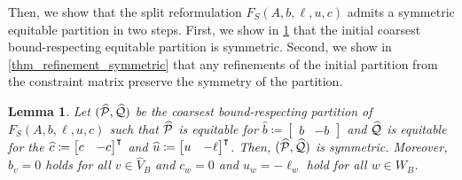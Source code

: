 \documentclass[pdflatex,sn-mathphys-num]{sn-jnl}%
\theoremstyle{thmstyleone}%
\newtheorem{lemma}[lemma]{Lemma}
\theoremstyle{thmstylethree}%
\theoremstyle{thmstyletwo}%
\begin{document}
Then, we show that the split reformulation $F_S(A,b,\ell,u,c)$ admits a symmetric equitable partition in two steps. First, we show in \cref{thm_initial_partition_symmetric} that the initial coarsest bound-respecting equitable partition is symmetric. Second, we show in \cref{thm_refinement_symmetric} that any refinements of the initial partition from the constraint matrix preserve the symmetry of the partition. 

\begin{lemma}
\label{thm_initial_partition_symmetric}
Let $(\widehat{\mathcal{P}},\widehat{\mathcal{Q}})$ be the coarsest bound-respecting partition of $F_S(A,b,\ell,u,c)$ such that $\widehat{\mathcal{P}}$ is equitable for $\widehat{b} \coloneqq \begin{bmatrix}
    b & - b
\end{bmatrix}$ and $\widehat{\mathcal{Q}}$ is equitable for the $\widehat{c} \coloneqq \transpose{\begin{bmatrix}
    c & -c
\end{bmatrix}}$ and $\widehat{u} \coloneqq \transpose{\begin{bmatrix}
    u & -\ell
\end{bmatrix}}$.
Then, $(\widehat{\mathcal{P}},\widehat{\mathcal{Q}})$ is symmetric. Moreover, $b_v = 0$ holds for all $v\in \widehat{V}_B$ and $c_w =0$ and $u_w = -\ell_w$ hold for all $w\in W_B$.
\end{lemma}
\end{document}
